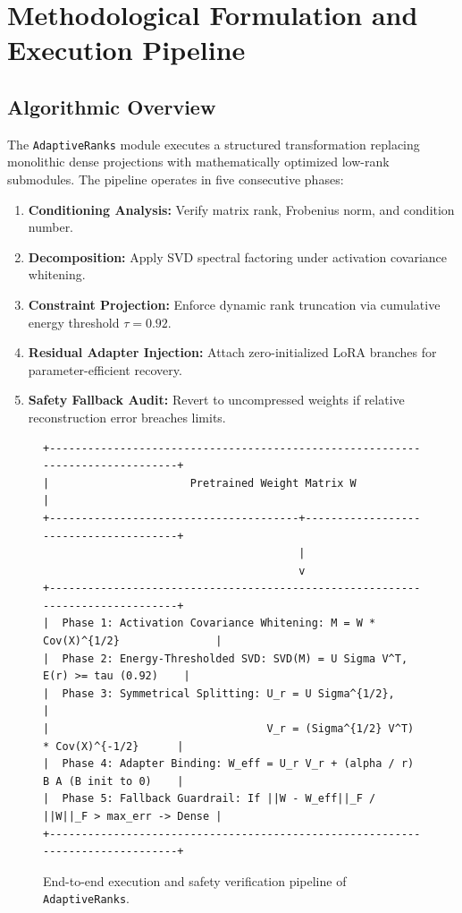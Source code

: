 \section{Methodological Formulation and Execution Pipeline}

\subsection{Algorithmic Overview}
The \texttt{AdaptiveRanks} module executes a structured transformation replacing monolithic dense projections with mathematically optimized low-rank submodules. The pipeline operates in five consecutive phases:
\begin{enumerate}
  \item \textbf{Conditioning Analysis:} Verify matrix rank, Frobenius norm, and condition number.
  \item \textbf{Decomposition:} Apply SVD spectral factoring under activation covariance whitening.
  \item \textbf{Constraint Projection:} Enforce dynamic rank truncation via cumulative energy threshold $\tau = 0.92$.
  \item \textbf{Residual Adapter Injection:} Attach zero-initialized LoRA branches for parameter-efficient recovery.
  \item \textbf{Safety Fallback Audit:} Revert to uncompressed weights if relative reconstruction error breaches limits.
\end{enumerate}

\begin{figure}[t]
\centering
\begin{verbatim}
+-------------------------------------------------------------------------------+
|                      Pretrained Weight Matrix W                               |
+---------------------------------------+---------------------------------------+
                                        |
                                        v
+-------------------------------------------------------------------------------+
|  Phase 1: Activation Covariance Whitening: M = W * Cov(X)^{1/2}               |
|  Phase 2: Energy-Thresholded SVD: SVD(M) = U Sigma V^T, E(r) >= tau (0.92)    |
|  Phase 3: Symmetrical Splitting: U_r = U Sigma^{1/2},                         |
|                                  V_r = (Sigma^{1/2} V^T) * Cov(X)^{-1/2}      |
|  Phase 4: Adapter Binding: W_eff = U_r V_r + (alpha / r) B A (B init to 0)    |
|  Phase 5: Fallback Guardrail: If ||W - W_eff||_F / ||W||_F > max_err -> Dense |
+-------------------------------------------------------------------------------+
\end{verbatim}
\caption{End-to-end execution and safety verification pipeline of \texttt{AdaptiveRanks}.}
\end{figure}

